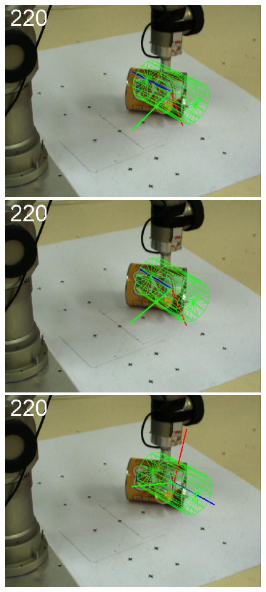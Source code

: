\begin{figure}[htbp]
{\includegraphics[width=\imgAXwid]{images/A3_2exp_39_4}
\includegraphics[width=\imgAXwid]{images/A3_LWPR1_39_4}
\includegraphics[width=\imgAXwid]{images/A3_physx_39_4}
}
\end{figure}
